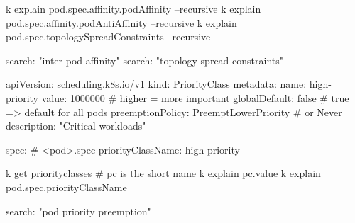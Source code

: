 \begin{tcbitemize}[
  raster columns=4, raster equal height=rows,
  blanker, cheat subtitle
]
\begin{tcbitemize}[
      raster columns=1, raster equal height=rows,
      blanker, cheat subtitle
    ]
        \begin{cheatcodebash}
        k explain pod.spec.affinity.podAffinity --recursive
        k explain pod.spec.affinity.podAntiAffinity --recursive
        k explain pod.spec.topologySpreadConstraints --recursive
        \end{cheatcodebash}

        \begin{cheatcodebash}
        search: "inter-pod affinity"
        search: "topology spread constraints"
        \end{cheatcodebash}

      \tcbitem


        \begin{cheatcodebash}
        apiVersion: scheduling.k8s.io/v1
        kind: PriorityClass
        metadata: {name: high-priority}
        value: 1000000       # higher = more important
        globalDefault: false  # true => default for all pods
        preemptionPolicy: PreemptLowerPriority  # or Never
        description: "Critical workloads"
        \end{cheatcodebash}

        \begin{cheatcodebash}
        spec:                  # <pod>.spec
          priorityClassName: high-priority
        \end{cheatcodebash}

        \begin{cheatcodebash}
        k get priorityclasses   # pc is the short name
        k explain pc.value
        k explain pod.spec.priorityClassName
        \end{cheatcodebash}

        \begin{cheatcodebash}
        search: "pod priority preemption"
        \end{cheatcodebash}


\end{tcbitemize}
\end{tcbitemize}
